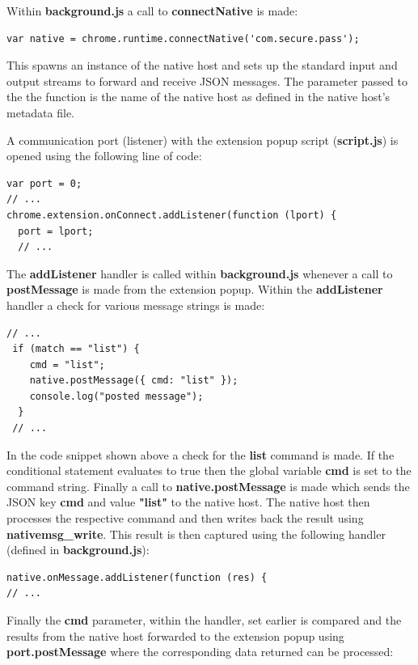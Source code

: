 Within \textbf{background.js} a call to \textbf{connectNative} is made:
\begin{lstlisting}[]
var native = chrome.runtime.connectNative('com.secure.pass');
\end{lstlisting}

This spawns an instance of the native host and sets up the standard input and output streams to forward and receive JSON messages. The parameter passed to the the function is the name of the native host as defined in the native host's metadata file.

A communication port (listener) with the extension popup script (\textbf{script.js}) is opened using the following line of code:

\begin{lstlisting}[]
var port = 0;
// ...
chrome.extension.onConnect.addListener(function (lport) {
  port = lport;
  // ...
\end{lstlisting}

The \textbf{addListener} handler is called within \textbf{background.js} whenever a call to \textbf{postMessage} is made from the extension popup. Within the \textbf{addListener} handler a check for various message strings is made: 
\begin{lstlisting}[]
 // ...
 if (match == "list") {
    cmd = "list";
    native.postMessage({ cmd: "list" });
    console.log("posted message");
  }
 // ...
\end{lstlisting}

In the code snippet shown above a check for the \textbf{list} command is made. If the conditional statement evaluates to true then the global variable \textbf{cmd} is set to the command string. Finally a call to \textbf{native.postMessage} is made which sends the JSON key \textbf{cmd} and value \textbf{"list"} to the native host. The native host then processes the respective command and then writes back the result using \textbf{nativemsg\_write}. This result is then captured using the following handler (defined in \textbf{background.js}):

\begin{lstlisting}[]
native.onMessage.addListener(function (res) {
// ...
\end{lstlisting}

Finally the \textbf{cmd} parameter, within the handler, set earlier is compared and the results from the native host forwarded to the extension popup using \textbf{port.postMessage} where the corresponding data returned can be processed:

